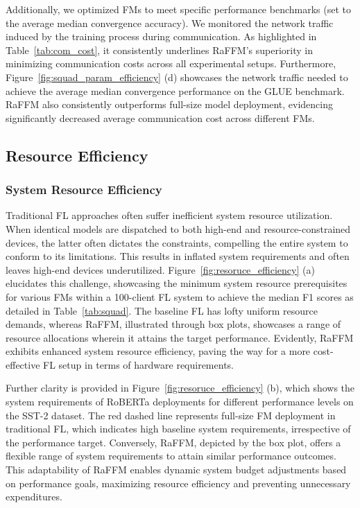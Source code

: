 Additionally, we optimized FMs to meet specific performance benchmarks (set to the average median convergence accuracy). We monitored the network traffic induced by the training process during communication. As highlighted in Table~\ref{tab:com_cost}, it consistently underlines RaFFM's superiority in minimizing communication costs across all experimental setups.
Furthermore, Figure~\ref{fig:squad_param_efficiency} (d) showcases the network traffic needed to achieve the average median convergence performance on the GLUE benchmark. RaFFM also consistently outperforms full-size model deployment, evidencing significantly decreased average communication cost across different FMs.






\subsection{Resource Efficiency}

\subsubsection{System Resource Efficiency}
Traditional FL approaches often suffer inefficient system resource utilization. When identical models are dispatched to both high-end and resource-constrained devices, the latter often dictates the constraints, compelling the entire system to conform to its limitations. This results in inflated system requirements and often leaves high-end devices underutilized.
Figure~\ref{fig:resoruce_efficiency} (a) elucidates this challenge, showcasing the minimum system resource prerequisites for various FMs within a 100-client FL system to achieve the median F1 scores as detailed in Table~\ref{tab:squad}. The baseline FL has lofty uniform resource demands, whereas RaFFM, illustrated through box plots, showcases a range of resource allocations wherein it attains the target performance. Evidently, RaFFM exhibits enhanced system resource efficiency, paving the way for a more cost-effective FL setup in terms of hardware requirements.


Further clarity is provided in Figure~\ref{fig:resoruce_efficiency} (b), which shows the system requirements of RoBERTa deployments for different performance levels on the SST-2 dataset. The red dashed line represents full-size FM deployment in traditional FL, which indicates high baseline system requirements, irrespective of the performance target. Conversely, RaFFM, depicted by the box plot, offers a flexible range of system requirements to attain similar performance outcomes. This adaptability of RaFFM enables dynamic system budget adjustments based on performance goals, maximizing resource efficiency and preventing unnecessary expenditures.


